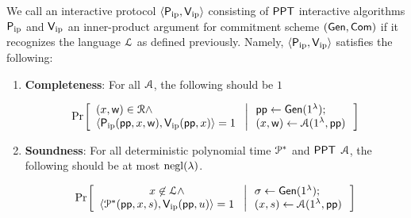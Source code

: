 \begin{definition}\label{defn:innerproductarg} 
	We call an interactive protocol $\langle \mathsf{P}_\mathrm{ip},\mathsf{V}_\mathrm{ip}\rangle$ consisting of $\mathsf{PPT}$ interactive algorithms $\mathsf{P}_\mathrm{ip}$ and $\mathsf{V}_\mathrm{ip}$ an inner-product argument for commitment scheme $(\mathsf{Gen},\mathsf{Com})$ if it recognizes the language $\mathcal{L}$ as defined previously. Namely, $\langle \mathsf{P}_\mathrm{ip},\mathsf{V}_\mathrm{ip}\rangle$ satisfies the following:
	\begin{enumerate}[{\rm (i)}]
		\item {\bf Completeness}: For all $\mathcal{A}$, the following should be $1$
		
		\footnotesize %
		\begin{align*}
		\condprob{
			\begin{array}{l}
			(\stmt,\wit)\in \calR \wedge \\ \langle \pip(\mathsf{pp},\stmt,\wit),\vip(\mathsf{pp},\stmt)\rangle=1
			\end{array}}{
			\begin{array}{l}
			\mathsf{pp}\gets \gen(\secparam);\\
			(\stmt,\wit)\gets \adv(\secparam,\mathsf{pp})
			\end{array}
		}
		\end{align*}
		\normalsize
		\item{\bf Soundness}: For all deterministic polynomial time $\mathcal{P}^*$ and $\mathsf{PPT}$  $\mathcal{A}$, the following should be at most $\mathrm{negl}(\lambda)$.
		
		{\footnotesize %
			
			\begin{align*}
			\condprob{
				\begin{array}{c}
				\stmt\not\in \calL \wedge \\
				\langle
				\prover^*(\mathsf{pp},\stmt,s),\vip(\mathsf{pp},u)\rangle=1
				\end{array}}{
				\begin{array}{l}
				\sigma\gets \gen(\secparam);\\
				(\stmt,s)\gets \adv(\secparam,\mathsf{pp})
				\end{array}
			} 
			\end{align*}
		}
	\end{enumerate}
	
\end{definition}
